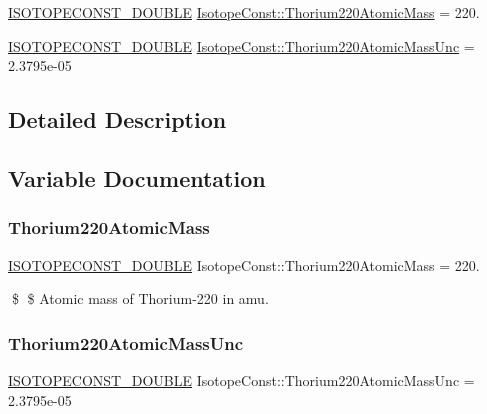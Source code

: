 \begin{DoxyCompactItemize}
\item 
\mbox{\hyperlink{group___isotope_const-_macros_ga8f45a7272ce02c0b4c65c44636ed719a}{I\+S\+O\+T\+O\+P\+E\+C\+O\+N\+S\+T\+\_\+\+D\+O\+U\+B\+LE}} \mbox{\hyperlink{group___isotope_const-_thorium-_th220_ga02738ecf52eb8119b7553aceaa102e09}{Isotope\+Const\+::\+Thorium220\+Atomic\+Mass}} = 220.
\item 
\mbox{\hyperlink{group___isotope_const-_macros_ga8f45a7272ce02c0b4c65c44636ed719a}{I\+S\+O\+T\+O\+P\+E\+C\+O\+N\+S\+T\+\_\+\+D\+O\+U\+B\+LE}} \mbox{\hyperlink{group___isotope_const-_thorium-_th220_gad006aad49bdd0c9638492cad1583d514}{Isotope\+Const\+::\+Thorium220\+Atomic\+Mass\+Unc}} = 2.\+3795e-\/05
\end{DoxyCompactItemize}


\subsection{Detailed Description}


\subsection{Variable Documentation}
\mbox{\label{group___isotope_const-_thorium-_th220_ga02738ecf52eb8119b7553aceaa102e09}} 
\subsubsection{\texorpdfstring{Thorium220\+Atomic\+Mass}{Thorium220AtomicMass}}
{\footnotesize\ttfamily \mbox{\hyperlink{group___isotope_const-_macros_ga8f45a7272ce02c0b4c65c44636ed719a}{I\+S\+O\+T\+O\+P\+E\+C\+O\+N\+S\+T\+\_\+\+D\+O\+U\+B\+LE}} Isotope\+Const\+::\+Thorium220\+Atomic\+Mass = 220.}

\$ \$ Atomic mass of Thorium-\/220 in amu. \mbox{\label{group___isotope_const-_thorium-_th220_gad006aad49bdd0c9638492cad1583d514}} 
\subsubsection{\texorpdfstring{Thorium220\+Atomic\+Mass\+Unc}{Thorium220AtomicMassUnc}}
{\footnotesize\ttfamily \mbox{\hyperlink{group___isotope_const-_macros_ga8f45a7272ce02c0b4c65c44636ed719a}{I\+S\+O\+T\+O\+P\+E\+C\+O\+N\+S\+T\+\_\+\+D\+O\+U\+B\+LE}} Isotope\+Const\+::\+Thorium220\+Atomic\+Mass\+Unc = 2.\+3795e-\/05}


